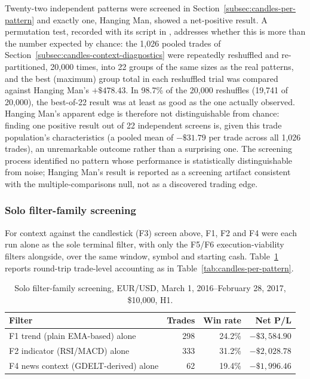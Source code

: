 Twenty-two independent patterns were screened in Section~\ref{subsec:candles-per-pattern} and exactly one, Hanging Man, showed a net-positive result. A permutation test, recorded with its script in , addresses whether this is more than the number expected by chance: the 1,026 pooled trades of Section~\ref{subsec:candles-context-diagnostics} were repeatedly reshuffled and re-partitioned, 20,000 times, into 22 groups of the same sizes as the real patterns, and the best (maximum) group total in each reshuffled trial was compared against Hanging Man's $+\$478.43$. In 98.7\% of the 20,000 reshuffles (19,741 of 20,000), the best-of-22 result was at least as good as the one actually observed. Hanging Man's apparent edge is therefore not distinguishable from chance: finding one positive result out of 22 independent screens is, given this trade population's characteristics (a pooled mean of $-\$31.79$ per trade across all 1,026 trades), an unremarkable outcome rather than a surprising one. The screening process identified no pattern whose performance is statistically distinguishable from noise; Hanging Man's result is reported as a screening artifact consistent with the multiple-comparisons null, not as a discovered trading edge.

\subsubsection{Solo filter-family screening} \label{subsec:solo-filter-sweep}

For context against the candlestick (F3) screen above, F1, F2 and F4 were each run alone as the sole terminal filter, with only the F5/F6 execution-viability filters alongside, over the same window, symbol and starting cash. Table~\ref{tab:solo-filter-sweep} reports round-trip trade-level accounting as in Table~\ref{tab:candles-per-pattern}.

\begin{table}[htbp]
\centering
\caption{Solo filter-family screening, EUR/USD, March 1, 2016--February 28, 2017, \$10,000, H1.}
\label{tab:solo-filter-sweep}
\small
\begin{tabular}{lrrr}
\toprule
\textbf{Filter} & \textbf{Trades} & \textbf{Win rate} & \textbf{Net P/L} \\
\midrule
F1 trend (plain EMA-based) alone & 298 & 24.2\% & $-\$3{,}584.90$ \\
F2 indicator (RSI/MACD) alone & 333 & 31.2\% & $-\$2{,}028.78$ \\
F4 news context (GDELT-derived) alone & 62 & 19.4\% & $-\$1{,}996.46$ \\
\bottomrule
\end{tabular}
\end{table}

